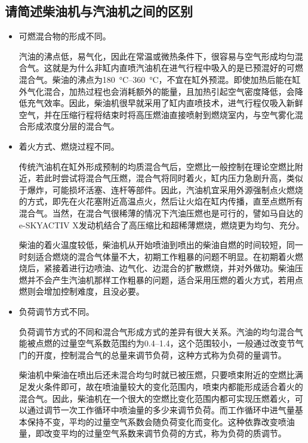 \documentclass[UTF8]{ctexart}
\numberwithin{figure}{section}
\numberwithin{table}{section}
\begin{document}
\subsection{请简述柴油机与汽油机之间的区别}

\begin{itemize}
	\item 可燃混合物的形成不同。

	      汽油的沸点低，易气化，因此在常温或微热条件下，很容易与空气形成均匀混合气。这就是为什么非缸内直喷汽油机在进气行程中吸入的是已预混好的可燃混合气。柴油的沸点为\qtyrange[range-phrase = $\,\sim\,$, range-units = single]{180}{360}{\celsius}，不宜在缸外预混。即使加热后能在缸外气化混合，加热过程也会消耗额外的能量，且加热引起空气密度降低，会降低充气效率。因此，柴油机很早就采用了缸内直喷技术，进气行程仅吸入新鲜空气，并在压缩行程将结束时将高压燃油直接喷射到燃烧室内，与空气雾化混合形成浓度分层的混合气。

	\item 着火方式、燃烧过程不同。

	      传统汽油机在缸外形成预制的均质混合气后，空燃比一般控制在理论空燃比附近，若此时尝试将混合气压燃，混合气将同时着火，缸内压力急剧升高，类似于爆炸，可能损坏活塞、连杆等部件。因此，汽油机宜采用外源强制点火燃烧的方式，即先在火花塞附近高温点火，然后让火焰在缸内传播，直至点燃所有混合气。当然，在混合气很稀薄的情况下汽油压燃也是可行的，譬如马自达的e-SKYACTIV X发动机结合了高压缩比和超稀薄燃烧，燃烧更为均匀、充分。

	      柴油的着火温度较低，柴油机从开始喷油到喷出的柴油自燃的时间较短，同一时刻适合燃烧的混合气体量不大，初期工作粗暴的问题不明显。在初期着火燃烧后，紧接着进行边喷油、边气化、边混合的扩散燃烧，并对外做功。柴油压燃并不会产生汽油机那样工作粗暴的问题，适合采用压燃的着火方式，若用点燃则会增加控制难度，且没必要。

	\item 负荷调节方式不同。

	      负荷调节方式的不同和混合气形成方式的差异有很大关系。汽油的均匀混合气能被点燃的过量空气系数范围约为\numrange[range-phrase = $\,\sim\,$]{0.4}{1.4}，这个范围较小，一般通过改变节气门的开度，控制混合气的总量来调节负荷，这种方式称为负荷的量调节。

	      柴油机中柴油在喷出后还未混合均匀时就已被压燃，只要喷束附近的空燃比满足发火条件即可，故在喷油量较大的变化范围内，喷束内都能形成适合着火的混合气。因此，柴油机在一个很大的空燃比变化范围内都可实现压燃着火，可以通过调节一次工作循环中喷油量的多少来调节负荷。而工作循环中进气量基本保持不变，平均的过量空气系数会随负荷变化而变化。这种依靠改变喷油量，即改变平均的过量空气系数来调节负荷的方式，称为负荷的质调节。


\end{itemize}
\end{document}
